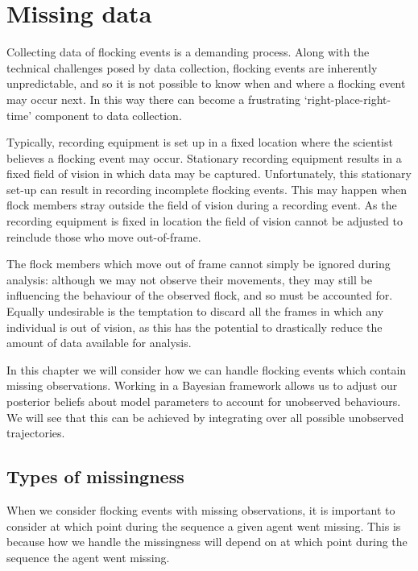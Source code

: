 \graphicspath{{fig/missing/}}

\chapter{Missing data}
\label{cha:missing}

Collecting data of flocking events is a demanding process. Along with the
technical challenges posed by data collection, flocking events are inherently
unpredictable, and so it is not possible to know when and where a flocking
event may occur next. In this way there can become a frustrating
`right-place-right-time' component to data collection.

Typically, recording equipment is set up in a fixed location where the
scientist believes a flocking event may occur. Stationary recording equipment
results in a fixed field of vision in which data may be captured.
Unfortunately, this stationary set-up can result in recording incomplete
flocking events. This may happen when flock members stray outside the field of
vision during a recording event. As the recording equipment is fixed in
location the field of vision cannot be adjusted to reinclude those who move
out-of-frame.

The flock members which move out of frame cannot simply be ignored during
analysis: although we may not observe their movements, they may still be
influencing the behaviour of the observed flock, and so must be accounted for.
Equally undesirable is the temptation to discard all the frames in which any
individual is out of vision, as this has the potential to drastically reduce
the amount of data available for analysis.

In this chapter we will consider how we can handle flocking events which
contain missing observations. Working in a Bayesian framework allows us to
adjust our posterior beliefs about model parameters to account for unobserved
behaviours. We will see that this can be achieved by integrating over all 
possible unobserved trajectories.

\section{Types of missingness}

When we consider flocking events with missing observations, it is important to
consider at which point during the sequence a given agent went missing. This is
because how we handle the missingness will depend on at which point during the
sequence the agent went missing.

